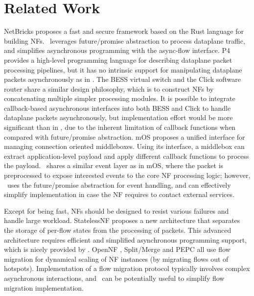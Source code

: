 \section{Related Work} \label{sec:netstar-related-work}

NetBricks proposes a fast and secure framework based on the Rust \cite{199352} language for building NFs. %
\netstar~leverages future/promise abstraction to process dataplane traffic, and simplifies asynchronous programming with the async-flow interface.
P4 \cite{bosshart2014p4} provides a high-level programming language for describing dataplane packet processing pipelines, but it has no intrinsic support for manipulating dataplane packets asynchronously as in \netstar. The BESS virtual switch \cite{bess} and the Click software router \cite{kohler2000click} share a similar design philosophy, which is to construct NFs by concatenating multiple simpler processing modules. It is possible to integrate callback-based asynchronous interfaces into both BESS and Click to handle dataplane packets asynchronously, but implementation effort would be more significant than in \netstar, due to the inherent limitation of callback functions when compared with future/promise abstraction.
mOS \cite{201546} proposes a unified interface for managing connection oriented middleboxes. Using its interface, a middlebox can extract application-level payload and apply different callback functions to process the payload. \netstar~shares a similar event layer as in mOS, where the packet is preprocessed to expose interested events to the core NF processing logic; however, \netstar~uses the future/promise abstraction for event handling, and can effectively simplify implementation in case the NF requires to contact external services.

Except for being fast, NFs should be designed to resist various failures and handle large workload. %
StatelessNF \cite{201545} proposes a new architecture that separates the storage of per-flow states from the processing of packets. This advanced architecture requires efficient and simplified asynchronous programming support, which is nicely provided by \netstar. OpenNF \cite{gember2015opennf}, Split/Merge \cite{rajagopalan2013split} and PEPC \cite{Qazi:2017:HPP:3098822.3098848} all use flow migration for dynamical scaling of NF instances (by migrating flows out of hotspots). Implementation of a flow migration protocol typically involves complex asynchronous interactions, and \netstar~can be potentially useful to simplify flow migration implementation.


